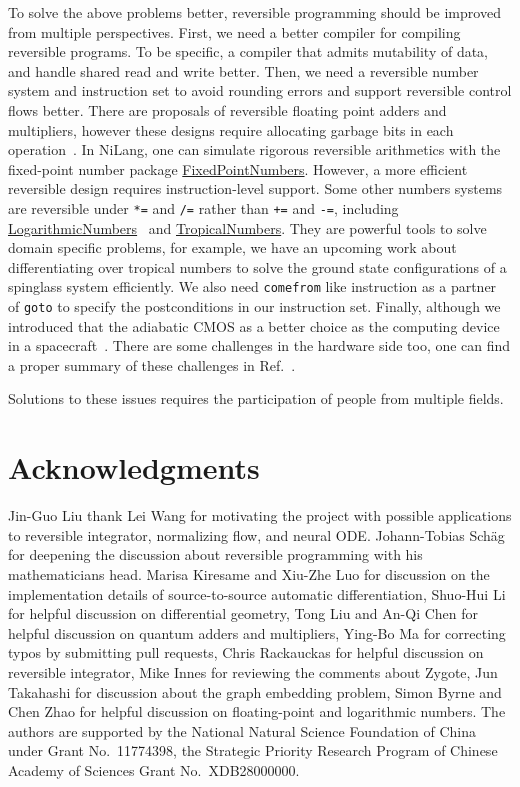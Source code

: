 \documentclass{article}
\newcommand{\<}{\langle}
\renewcommand{\>}{\rangle}
\newcommand{\Ref}[1]{Ref.~\cite{#1}}
\theoremstyle{definition}\newtheorem{definition}{\textit{Definition}}
\begin{document}
To solve the above problems better, reversible programming should be improved from multiple perspectives.
First, we need a better compiler for compiling reversible programs.
To be specific, a compiler that admits mutability of data, and handle shared read and write better.
Then, we need a reversible number system and instruction set to avoid rounding errors and support reversible control flows better.
There are proposals of reversible floating point adders and multipliers, however these designs require allocating garbage bits in each operation~\cite{Nachtigal2010,Nachtigal2011,Nguyen2013,Hner2018}.
In NiLang, one can simulate rigorous reversible arithmetics with the fixed-point number package \href{https://github.com/JuliaMath/FixedPointNumbers.jl}{FixedPointNumbers}.
However, a more efficient reversible design requires instruction-level support.
Some other numbers systems are reversible under \texttt{*=} and \texttt{/=} rather than \texttt{+=} and \texttt{-=}, including \href{https://github.com/cjdoris/LogarithmicNumbers.jl}{LogarithmicNumbers}~\cite{Taylor1988} and \href{https://github.com/GiggleLiu/TropicalNumbers.jl}{TropicalNumbers}.
They are powerful tools to solve domain specific problems, for example, we have an upcoming work about differentiating over tropical numbers to solve the ground state configurations of a spinglass system efficiently.
We also need \texttt{comefrom} like instruction as a partner of \texttt{goto} to specify the postconditions in our instruction set.
Finally, although we introduced that the adiabatic CMOS as a better choice as the computing device in a spacecraft~\cite{Debenedictis2017}.
There are some challenges in the hardware side too, one can find a proper summary of these challenges in \Ref{Frank2005b}.

Solutions to these issues requires the participation of people from multiple fields.

\section{Acknowledgments}
Jin-Guo Liu thank Lei Wang for motivating the project with possible applications to reversible integrator, normalizing flow, and neural ODE.
Johann-Tobias Schäg for deepening the discussion about reversible programming with his mathematicians head.
Marisa Kiresame and Xiu-Zhe Luo for discussion on the implementation details of source-to-source automatic differentiation,
Shuo-Hui Li for helpful discussion on differential geometry, Tong Liu and An-Qi Chen for helpful discussion on quantum adders and multipliers, Ying-Bo Ma for correcting typos by submitting pull requests, Chris Rackauckas for helpful discussion on reversible integrator, Mike Innes for reviewing the comments about Zygote, Jun Takahashi for discussion about the graph embedding problem, Simon Byrne and Chen Zhao for helpful discussion on floating-point and logarithmic numbers.
The authors are supported by the National Natural Science Foundation of China under Grant No.~11774398, the Strategic Priority Research Program of Chinese Academy of Sciences Grant No.~XDB28000000.
\end{document}
